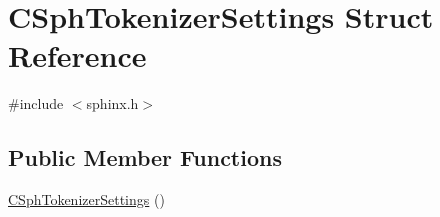 \hypertarget{structCSphTokenizerSettings}{\section{C\-Sph\-Tokenizer\-Settings Struct Reference}
\label{structCSphTokenizerSettings}
}


{\ttfamily \#include $<$sphinx.\-h$>$}

\subsection*{Public Member Functions}
\begin{DoxyCompactItemize}
\item 
\hyperlink{structCSphTokenizerSettings_a50020755d65fdd61ae99cef33e397bbe}{C\-Sph\-Tokenizer\-Settings} ()
\end{DoxyCompactItemize}
